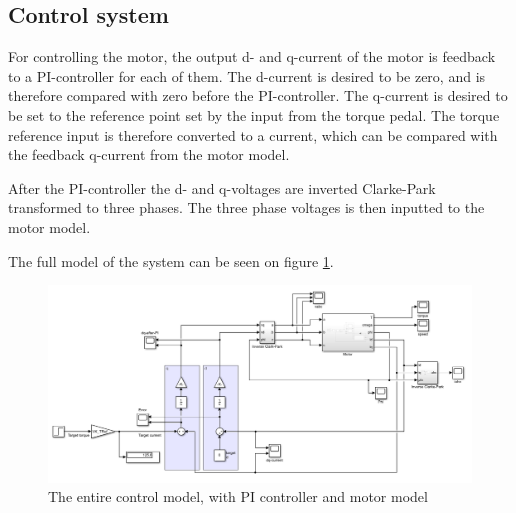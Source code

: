 

\subsection{Control system}
\label{sec:control_system}

For controlling the motor, the output d- and q-current of the motor is feedback to a PI-controller for each of them. The d-current is desired to be zero, and is therefore compared with zero before the PI-controller. The q-current is desired to be set to the reference point set by the input from the torque pedal. The torque reference input is therefore converted to a current, which can be compared with the feedback q-current from the motor model.

After the PI-controller the d- and q-voltages are inverted Clarke-Park transformed to three phases. The three phase voltages is then inputted to the motor model.

The full model of the system can be seen on figure \ref{fig:control_system}.


\begin{figure}[H]
	\centering
	\includegraphics[width=1\linewidth]{pictures/control/full_model.PNG}
	\caption{The entire control model, with PI controller and motor model}
	\label{fig:control_system}
\end{figure}

